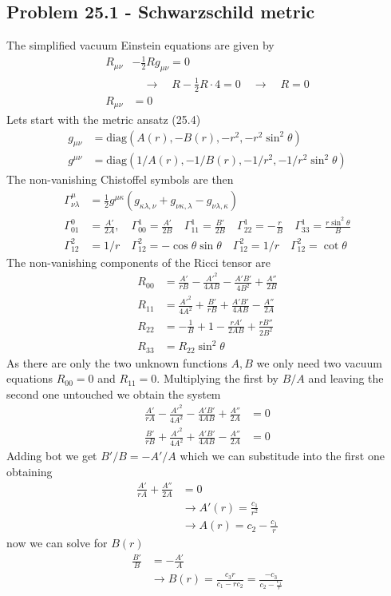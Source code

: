 \documentclass[../main.tex]{subfiles}
\begin{document}
\subsection{Problem 25.1 - Schwarzschild metric}
The simplified vacuum Einstein equations are given by
\begin{align}
R_{\mu\nu}&-\frac{1}{2}Rg_{\mu\nu}=0\\
&\quad\rightarrow\quad R-\frac{1}{2}R\cdot 4=0\quad\rightarrow\quad R=0\\
R_{\mu\nu}&=0
\end{align}
Lets start with the metric ansatz (25.4) 
\begin{align}
g_{\mu\nu}&=\text{diag}(A(r),-B(r),-r^2,-r^2\sin^2\theta)\\
g^{\mu\nu}&=\text{diag}(1/A(r),-1/B(r),-1/r^2,-1/r^2\sin^2\theta)
\end{align}
The non-vanishing Chistoffel symbols are then
\begin{align}
\Gamma^\mu_{\nu\lambda}&=\frac{1}{2}g^{\mu\kappa}(g_{\kappa\lambda,\nu}+g_{\nu\kappa,\lambda}-g_{\nu\lambda,\kappa})\\
\Gamma^0_{01}&=\frac{A'}{2A},\quad
\Gamma^1_{00}=\frac{A'}{2B}\quad
\Gamma^1_{11}=\frac{B'}{2B}\quad
\Gamma^1_{22}=-\frac{r}{B}\quad
\Gamma^1_{33}=\frac{r\sin^2\theta}{B}\\
\Gamma^2_{12}&=1/r\quad
\Gamma^2_{12}=-\cos\theta\sin\theta\quad
\Gamma^2_{12}=1/r\quad
\Gamma^2_{12}=\cot\theta
\end{align}
The non-vanishing components of the Ricci tensor are
\begin{align}
R_{00}&=\frac{A'}{rB}-\frac{A'^2}{4AB}-\frac{A'B'}{4B^2}+\frac{A''}{2B}\\
R_{11}&=\frac{A'^2}{4A^2}+\frac{B'}{rB}+\frac{A'B'}{4AB}-\frac{A''}{2A}\\
R_{22}&=-\frac{1}{B}+1-\frac{rA'}{2AB}+\frac{rB''}{2B^2}\\
R_{33}&=R_{22}\sin^2\theta
\end{align}
As there are only the two unknown functions $A, B$ we only need two vacuum equations $R_{00}=0$ and $R_{11}=0$. Multiplying the first by $B/A$ and leaving the second  one untouched we obtain the system
\begin{align}
\frac{A'}{rA}-\frac{A'^2}{4A^2}-\frac{A'B'}{4AB}+\frac{A''}{2A}&=0\\
\frac{B'}{rB}+\frac{A'^2}{4A^2}+\frac{A'B'}{4AB}-\frac{A''}{2A}&=0
\end{align}
Adding bot we get $B'/B=-A'/A$ which we can substitude into the first one obtaining
\begin{align}
\frac{A'}{rA}+\frac{A''}{2A}&=0\\
&\rightarrow A'(r)=\frac{c_1}{r^2}\\
&\rightarrow A(r)=c_2-\frac{c_1}{r}
\end{align}
now we can solve for $B(r)$
\begin{align}
\frac{B'}{B}&=-\frac{A'}{A}\\
&\rightarrow B(r)=\frac{c_3 r}{c_1-rc_2}=\frac{-c_3}{c_2-\frac{c_1}{r}}
\end{align}
\end{document}
